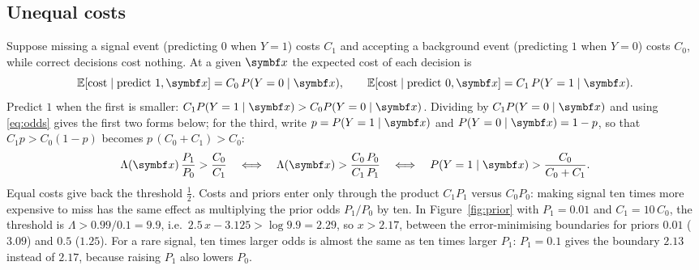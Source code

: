 \documentclass[11pt]{article}
\begin{document}
\subsection{Unequal costs}\label{sec:costs}

Suppose missing a signal event (predicting $0$ when $Y = 1$) costs $C_1$ and accepting a background event (predicting
$1$ when $Y = 0$) costs $C_0$, while correct decisions cost nothing. At a given $\x$ the expected cost of each
decision is
\[
  \E[\text{cost} \mid \text{predict } 1, \x] = C_0\, P(Y = 0 \mid \x), \qquad
  \E[\text{cost} \mid \text{predict } 0, \x] = C_1\, P(Y = 1 \mid \x) .
\]
Predict $1$ when the first is smaller: $C_1 P(Y = 1 \mid \x) > C_0 P(Y = 0 \mid \x)$. Dividing by
$C_1 P(Y = 0 \mid \x)$ and using \eqref{eq:odds} gives the first two forms below; for the third, write
$p = P(Y = 1 \mid \x)$ and $P(Y = 0 \mid \x) = 1 - p$, so that $C_1 p > C_0 (1 - p)$ becomes $p\,(C_0 + C_1) > C_0$:
\begin{equation}\label{eq:cost}
  \Lambda(\x)\,\frac{P_1}{P_0} > \frac{C_0}{C_1}
  \quad\Longleftrightarrow\quad
  \Lambda(\x) > \frac{C_0\, P_0}{C_1\, P_1}
  \quad\Longleftrightarrow\quad
  P(Y = 1 \mid \x) > \frac{C_0}{C_0 + C_1} .
\end{equation}
Equal costs give back the threshold $\tfrac12$. Costs and priors enter only through the product $C_1 P_1$ versus
$C_0 P_0$: making signal ten times more expensive to miss has the same effect as multiplying the prior odds
$P_1/P_0$ by ten. In Figure~\ref{fig:prior} with $P_1 = 0.01$ and $C_1 = 10\, C_0$, the threshold is
$\Lambda > 0.99/0.1 = 9.9$, i.e.\ $2.5\, x - 3.125 > \log 9.9 = 2.29$, so $x > 2.17$, between the error-minimising
boundaries for priors $0.01$ ($3.09$) and $0.5$ ($1.25$). For a rare signal, ten times larger odds is almost the same as
ten times larger $P_1$: $P_1 = 0.1$ gives the boundary $2.13$ instead of $2.17$, because raising $P_1$ also lowers $P_0$.
\end{document}
